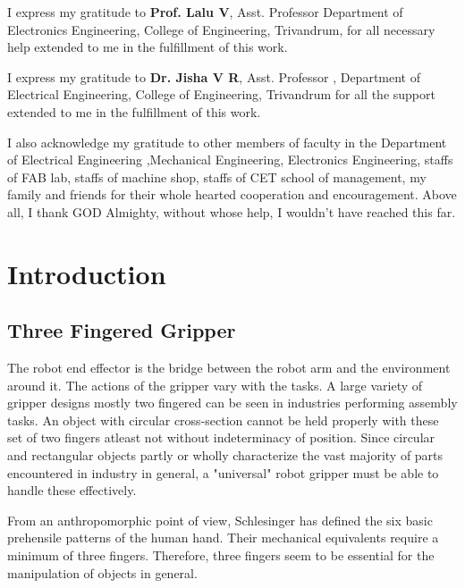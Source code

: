 \documentclass[a4paper,12pt,one side]{report}%
\begin{document}
I express my gratitude to \textbf{Prof. Lalu V}, Asst. Professor Department of Electronics Engineering, College of Engineering, Trivandrum, for all  necessary help extended to me in the fulfillment of this work.

I express my gratitude to \textbf {Dr. Jisha V R}, Asst. Professor , Department of Electrical Engineering, College of Engineering, Trivandrum for all the support extended to me in the fulfillment of this work.

\par


I also acknowledge my gratitude to other members of faculty in the Department of Electrical Engineering ,Mechanical Engineering, Electronics Engineering, staffs of FAB lab, staffs of machine shop, staffs of CET school of management, my family and friends for their whole hearted cooperation and encouragement. Above all, I thank GOD Almighty, without whose help, I wouldn't have reached this far.

 \newpage
\tableofcontents 	\cleardoublepage%
{} 
\listoffigures 	\cleardoublepage %

\listoftables 	\cleardoublepage%

\chapter{Introduction}
\label{chapintro}
\section{Three Fingered Gripper}
The robot end effector is the bridge between the robot arm and the environment around it. The actions of the gripper vary with the tasks. A large variety of gripper designs mostly two fingered can be seen in industries performing assembly tasks. An object with circular cross-section cannot be held properly with these set of two fingers atleast not without indeterminacy of position. Since circular and rectangular objects partly or wholly characterize the vast majority of parts encountered in industry in general, a "universal" robot gripper must be able to handle these effectively.

\par From an anthropomorphic point of view, Schlesinger has defined the six basic prehensile patterns of the human hand. Their mechanical equivalents require a minimum of three fingers. Therefore, three fingers seem to be essential for the manipulation of objects in general.
\end{document}
